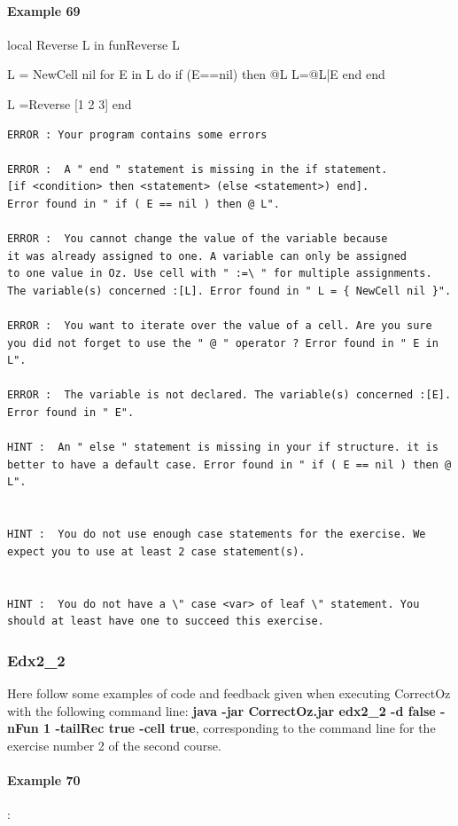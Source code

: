 \documentclass[11pt,a4paper,twoside,openright]{report}
\begin{document}
\paragraph{Example 69}
\begin{OZ}
local Reverse L in
	fun{Reverse L}

L = {NewCell nil}
for E in L do
    if (E==nil) then @L
    L=@L|E
end
	end

L ={Reverse [1 2 3]}
end

\end{OZ}
\begin{lstlisting}
ERROR : Your program contains some errors

ERROR :  A " end " statement is missing in the if statement. 
[if <condition> then <statement> (else <statement>) end]. 
Error found in " if ( E == nil ) then @ L".

ERROR :  You cannot change the value of the variable because 
it was already assigned to one. A variable can only be assigned 
to one value in Oz. Use cell with " :=\ " for multiple assignments. 
The variable(s) concerned :[L]. Error found in " L = { NewCell nil }".

ERROR :  You want to iterate over the value of a cell. Are you sure you did not forget to use the " @ " operator ? Error found in " E in L".

ERROR :  The variable is not declared. The variable(s) concerned :[E]. Error found in " E".

HINT :  An " else " statement is missing in your if structure. it is better to have a default case. Error found in " if ( E == nil ) then @ L".


HINT :  You do not use enough case statements for the exercise. We expect you to use at least 2 case statement(s).


HINT :  You do not have a \" case <var> of leaf \" statement. You should at least have one to succeed this exercise.
\end{lstlisting}

\subsubsection{Edx2\_2}
Here follow some examples of code and feedback given when executing 
CorrectOz with the following command line: \textbf{java -jar CorrectOz.jar edx2\_2 
-d false -nFun 1 -tailRec true -cell true}, corresponding to the command line 
for the exercise number 2 of the second course.


\paragraph{Example 70}:
\end{document}
